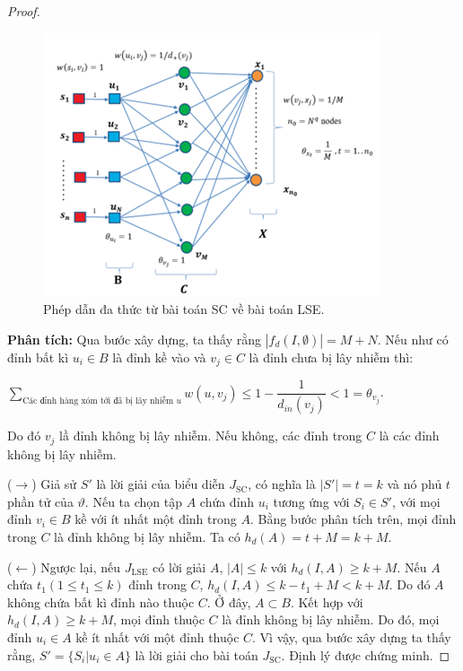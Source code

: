 \begin{proof}
\begin {itemize}
	\begin{figure}[H]
		\begin{center}
			\includegraphics [scale=0.8]{picture/reduce2}
			\caption{Phép dẫn đa thức từ bài toán SC về bài toán LSE.}
			\label{refhinh3_3}
		\end{center}
	\end{figure}
	\end {itemize}
	{\bfseries Phân tích:} Qua bước xây dựng, ta thấy rằng $| f_{d}(I,\emptyset) | = M + N$. Nếu như có đỉnh bất kì $u_{i} \in B$ là đỉnh kề vào và $v_{j} \in C$ là đỉnh chưa bị lây nhiễm thì: 
	\begin{center}
		$\sum_{\text{Các đỉnh hàng xóm tới đã bị lây nhiễm $u$}} w(u, v_{j}) \leq 1 - \dfrac{1}{d_{in}(v_{j})} < 1 = \theta_{v_{j}}$.
	\end{center}
	
	Do đó $v_{j}$ lầ đỉnh không bị lây nhiễm. Nếu không, các đỉnh trong $C$ là các đỉnh không bị lây nhiễm.
	
	($\rightarrow$) Giả sử $S'$ là lời giải của biểu diễn $J_{\text{SC}}$, có nghĩa là $| S' | = t = k$ và nó phủ $t$ phần tử của $\vartheta$. Nếu ta chọn tập $A$ chứa đỉnh $u_{i}$ tương ứng với $S_{i} \in S'$, với mọi đỉnh $v_{i} \in B$ kề với ít nhất một đỉnh trong $A$. Bằng bước phân tích trên, mọi đỉnh trong $C$ là đỉnh không bị lây nhiễm. Ta có $h_{d}(A) = t + M = k + M$.
	
	($\leftarrow$) Ngược lại, nếu $J_{\text{LSE}}$ có lời giải $A$, $|A| \leq k$ với $h_{d}(I, A) \geq k + M$. Nếu $A$ chứa $t_{1} (1 \leq t_{1} \leq k)$ đỉnh trong $C$, $h_{d}(I, A) \leq k - t_{1} + M < k + M$. Do đó $A$ không chứa bất kì đỉnh nào thuộc $C$. Ở đây, $A \subset B$. Kết hợp với $h_{d}(I, A) \geq k + M$, mọi đỉnh thuộc $C$ là đỉnh không bị lây nhiễm. Do đó, mọi đỉnh $u_{i} \in A$ kề ít nhất với một đỉnh thuộc $C$. Vì vậy, qua bước xây dựng ta thấy rằng, $S' = \{ S_{i} | u_{i} \in A \}$ là lời giải cho bài toán $J_{\text{SC}}$. Định lý được chứng minh.
\end{proof}


